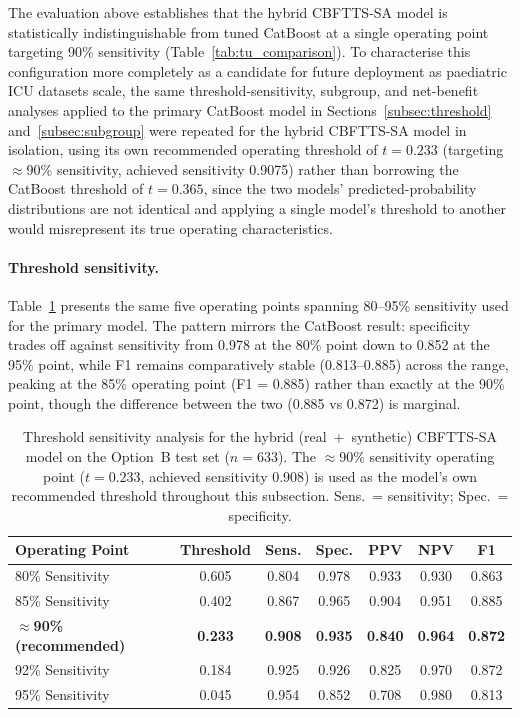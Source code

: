 \documentclass[final,3p,times]{elsarticle}
\begin{document}
The evaluation above establishes that the hybrid CBFTTS-SA model is
statistically indistinguishable from tuned CatBoost at a single
operating point targeting 90\% sensitivity (Table~\ref{tab:tu_comparison}).
To characterise this configuration more completely as a candidate for
future deployment as paediatric ICU datasets scale, the same
threshold-sensitivity, subgroup, and net-benefit analyses applied to
the primary CatBoost model in Sections~\ref{subsec:threshold}
and~\ref{subsec:subgroup} were repeated for the hybrid CBFTTS-SA model
in isolation, using its own recommended operating threshold of
$t = 0.233$ (targeting $\approx$90\% sensitivity, achieved sensitivity
0.9075) rather than borrowing the CatBoost threshold of $t = 0.365$,
since the two models' predicted-probability distributions are not
identical and applying a single model's threshold to another would
misrepresent its true operating characteristics.

\paragraph{Threshold sensitivity.} Table~\ref{tab:hybrid_threshold}
presents the same five operating points spanning 80--95\% sensitivity
used for the primary model. The pattern mirrors the CatBoost result:
specificity trades off against sensitivity from 0.978 at the 80\%
point down to 0.852 at the 95\% point, while F1 remains comparatively
stable (0.813--0.885) across the range, peaking at the 85\% operating
point (F1 = 0.885) rather than exactly at the 90\% point, though the
difference between the two (0.885 vs 0.872) is marginal.

\begin{table}[htbp]
\centering
\caption{Threshold sensitivity analysis for the hybrid (real~+~synthetic)
CBFTTS-SA model on the Option~B test set ($n = 633$). The
$\approx$90\% sensitivity operating point ($t = 0.233$, achieved
sensitivity 0.908) is used as the model's own recommended threshold
throughout this subsection. Sens.\ = sensitivity; Spec.\ = specificity.}
\label{tab:hybrid_threshold}
\small
\begin{tabular}{lcccccc}
\toprule
\textbf{Operating Point} & \textbf{Threshold} & \textbf{Sens.} &
\textbf{Spec.} & \textbf{PPV} & \textbf{NPV} & \textbf{F1} \\
\midrule
80\% Sensitivity              & 0.605 & 0.804 & 0.978 & 0.933 & 0.930 & 0.863 \\
85\% Sensitivity              & 0.402 & 0.867 & 0.965 & 0.904 & 0.951 & 0.885 \\
\textbf{$\approx$90\% (recommended)} & \textbf{0.233} & \textbf{0.908} &
\textbf{0.935} & \textbf{0.840} & \textbf{0.964} & \textbf{0.872} \\
92\% Sensitivity              & 0.184 & 0.925 & 0.926 & 0.825 & 0.970 & 0.872 \\
95\% Sensitivity              & 0.045 & 0.954 & 0.852 & 0.708 & 0.980 & 0.813 \\
\bottomrule
\end{tabular}
\end{table}
\end{document}
